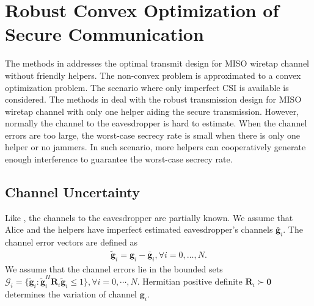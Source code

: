 \documentclass[journal]{IEEEtran}
\begin{document}
\section{Robust Convex Optimization of Secure Communication} \label{sec:robust programming}
The methods in \cite{li_optimal_2011} addresses the optimal transmit design for MISO wiretap channel without friendly helpers. The non-convex problem is approximated to a convex optimization problem. The scenario where only imperfect CSI is available is considered. The methods in \cite{Zhang_Cooperative2015,huang_cooperative_2011} deal with the robust transmission design for MISO wiretap channel with only one helper aiding the secure transmission. However, normally the channel to the eavesdropper is hard to estimate. When the channel errors are too large, the worst-case secrecy rate is small when there is only one  helper or no jammers. In such scenario, more helpers can cooperatively generate enough interference to guarantee the worst-case secrecy rate.
\subsection{Channel Uncertainty} 
Like \cite{huang_cooperative_2011}, the channels to the eavesdropper are partially known. We assume that  Alice and the helpers have imperfect estimated eavesdropper's channels $\bar{\mathbf{g}}_i$. The channel error vectors are defined as
\begin{eqnarray}
\tilde{\mathbf{g}}_i = \mathbf{g}_i-\bar{\mathbf{g}}_i,\forall i = 0,\ldots, N.
\end{eqnarray}
We assume that the channel errors lie in the bounded sets $\mathcal{G}_i=\{\tilde{\mathbf{g}}_i: \tilde{\mathbf{g}}_i^H \mathbf{R}_i\tilde{\mathbf{g}}_i \leq 1\}, \forall i = 0,\cdots,N$. Hermitian positive definite  $\mathbf{R}_i  \succ \mathbf{0}$ determines the variation of channel $\mathbf{g}_i$. 
\end{document}
